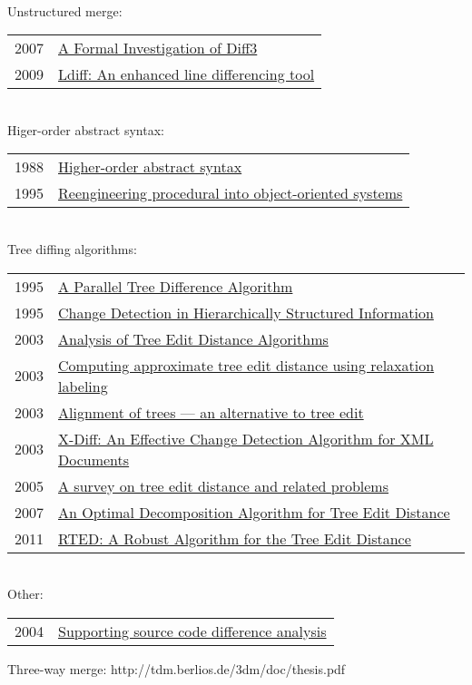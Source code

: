 \documentclass[12pt]{article}
\begin{document}
\\
Unstructured merge: \\
\begin{tabular}{ | l | l | }
	2007 & \href{http://www.cis.upenn.edu/~bcpierce/papers/diff3-short.pdf}{A Formal Investigation of Diff3 } \\
	2009 & \href{http://ieeexplore.ieee.org/xpl/articleDetails.jsp?tp=&arnumber=5070564}{Ldiff: An enhanced line differencing tool } \\
\end{tabular}
\\
Higer-order abstract syntax: \\
\begin{tabular}{ | l | l | }
	1988 & \href{http://dl.acm.org/citation.cfm?id=54010}{Higher-order abstract syntax} \\
	1995 & \href{http://ieeexplore.ieee.org/xpls/abs_all.jsp?arnumber=514712&tag=1}{Reengineering procedural into object-oriented systems} \\	
\end{tabular}
\\
Tree diffing algorithms: \\
\begin{tabular}{ | l | l | }
	1995 & \href{http://citeseerx.ist.psu.edu/viewdoc/summary?doi=10.1.1.48.8675}{A Parallel Tree Difference Algorithm } \\
	1995 & \href{http://ilpubs.stanford.edu:8090/115/1/1995-46.pdf}{Change Detection in Hierarchically Structured Information} \\
	2003 & \href{http://www.lifl.fr/~touzet/Publications/cpm03.pdf}{Analysis of Tree Edit Distance Algorithms} \\
	2003 & \href{http://www.sciencedirect.com/science/article/pii/S0167865502002556}{Computing approximate tree edit distance using relaxation labeling} \\
	2003 & \href{http://www.sciencedirect.com/science/article/pii/0304397595800299}{Alignment of trees — an alternative to tree edit} \\
	2003 & \href{http://ieeexplore.ieee.org/xpls/abs_all.jsp?arnumber=1260818}{X-Diff: An Effective Change Detection Algorithm for XML Documents} \\
	2005 & \href{http://citeseerx.ist.psu.edu/viewdoc/summary?doi=10.1.1.100.2577}{A survey on tree edit distance and related problems } \\
	2007 & \href{http://link.springer.com/chapter/10.1007\%2F978-3-540-73420-8_15?LI=true}{An Optimal Decomposition Algorithm for Tree Edit Distance}  \\ %
	2011 & \href{http://arxiv.org/abs/1201.0230}{RTED: A Robust Algorithm for the Tree Edit Distance}
\end{tabular}
\\
Other: \\
\begin{tabular}{ | l | l | }
	2004 & \href{http://ieeexplore.ieee.org/xpls/abs_all.jsp?arnumber=1357805}{Supporting source code difference analysis } \\
\end{tabular}

Three-way merge:
http://tdm.berlios.de/3dm/doc/thesis.pdf






\end{document}
